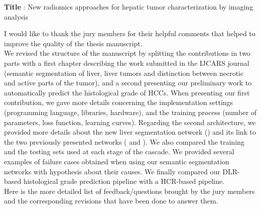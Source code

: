 \documentclass{article}
\begin{document}
\textbf{Title} : New radiomics approaches for hepatic tumor characterization by imaging analysis\\

\vspace{0.5cm}

I would like to thank the jury members for their helpful comments that helped to improve the quality of the thesis manuscript. \\
We revised the structure of the manuscript by splitting the contributions in two parts with a first chapter describing the work submitted in the IJCARS journal (semantic segmentation of liver, liver tumors and distinction between necrotic and active parts of the tumor), and a second presenting our preliminary work to automatically predict the histological grade of HCCs.
When presenting our first contribution, we gave more details concerning the implementation settings (programming language, libraries, hardware), and the training process (number of parameters, loss function, learning curves).
Regarding the second architecture, we provided more details about the new liver segmentation network () and its link to the two previously presented networks ( and ). We also compared the training and the testing sets used at each stage of the cascade.
We provided several examples of failure cases obtained when using our semantic segmentation networks with hypothesis about their causes.
We finally compared our DLR-based histological grade prediction pipeline with a HCR-based pipeline. \\

Here is the more detailed list of feedback/questions brought by the jury members and the corresponding revisions that have been done to answer them.
\end{document}
